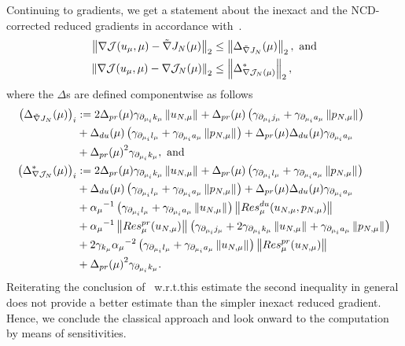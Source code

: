 Continuing to gradients, we get a statement about the inexact and the NCD-corrected reduced gradients in accordance with~\cite[Proposition 3.8]{Keil2021}.
\begin{align*}
    \norm[2]{\nabla \mathcal{J}(u_\mu, \mu) - \tilde{\nabla} J_N(\mu)} &\leq \norm[2]{\Delta_{\tilde{\nabla} J_N}(\mu)}, \text{ and} \\
    \norm[2]{\nabla \mathcal{J}(u_\mu, \mu) - \nabla \mathcal{J}_N(\mu)} &\leq \norm[2]{\Delta_{\nabla \mathcal{J}_N (\mu)}^*},
\end{align*}
where the $\Delta$s are defined componentwise as follows
\begin{align*}
    {\left( \Delta_{\tilde{\nabla} J_N}(\mu) \right)}_i &:= 2 \Delta_{pr}(\mu) \gamma_{\partial_{\mu_i} k_\mu} \norm{u_{N, \mu}} + \Delta_{pr}(\mu) \left( \gamma_{\partial_{\mu_i} j_\mu} + \gamma_{\partial_{\mu_i} a_\mu} \norm{p_{N, \mu}} \right) \\
    &+ \Delta_{du}(\mu) \left( \gamma_{\partial_{\mu_i} l_\mu} + \gamma_{\partial_{\mu_i} a_\mu} \norm{p_{N, \mu}} \right) + \Delta_{pr}(\mu) \Delta_{du}(\mu) \gamma_{\partial_{\mu_i} a_\mu} \\
    &+ {\Delta_{pr}(\mu)}^2 \gamma_{\partial_{\mu_i} k_\mu}, \text{ and} \\
    {\left( \Delta_{\nabla \mathcal{J}_N}^*(\mu) \right)}_i &:= 2 \Delta_{pr}(\mu) \gamma_{\partial_{\mu_i} k_\mu} \norm{u_{N, \mu}} + \Delta_{pr}(\mu) \left( \gamma_{\partial_{\mu_i} l_\mu} + \gamma_{\partial_{\mu_i} a_\mu} \norm{p_{N, \mu}} \right) \\
    &+ \Delta_{du}(\mu) \left( \gamma_{\partial_{\mu_i} l_\mu} + \gamma_{\partial_{\mu_i} a_\mu} \norm{p_{N, \mu}} \right) + \Delta_{pr}(\mu) \Delta_{du}(\mu) \gamma_{\partial_{\mu_i} a_\mu} \\
    &+ {\alpha_\mu}^{-1} \left( \gamma_{\partial_{\mu_i} l_\mu} + \gamma_{\partial_{\mu_i} a_\mu} \norm{u_{N, \mu}} \right) \norm{Res_\mu^{du}(u_{N, \mu}, p_{N, \mu})} \\
    &+ {\alpha_\mu}^{-1} \norm{Res_\mu^{pr}(u_{N, \mu})} \left( \gamma_{\partial_{\mu_i} j_\mu} + 2 \gamma_{\partial_{\mu_i} k_\mu} \norm{u_{N, \mu}} + \gamma_{\partial_{\mu_i} a_\mu} \norm{p_{N, \mu}} \right) \\
    &+ 2 \gamma_{k_\mu} {\alpha_\mu}^{-2} \left( \gamma_{\partial_{\mu_i} l_\mu} + \gamma_{\partial_{\mu_i} a_\mu} \norm{u_{N, \mu}} \right) \norm{Res_\mu^{pr}(u_{N, \mu})} \\
    &+ {\Delta_{pr}(\mu)}^2 \gamma_{\partial_{\mu_i} k_\mu}. \\
\end{align*}
Reiterating the conclusion of~\cite{Keil2021} w.r.t.\@ this estimate the second inequality in general does not provide a better estimate than the simpler inexact reduced gradient.
Hence, we conclude the classical approach and look onward to the computation by means of sensitivities.

